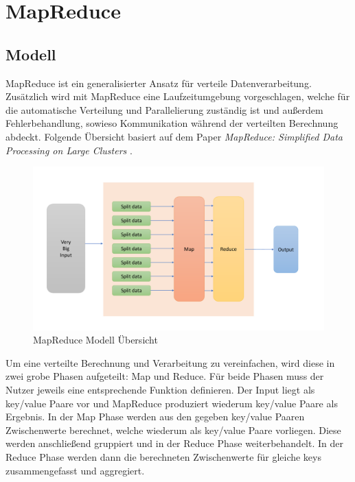 

\chapter{MapReduce}
\label{MapReduce}

\section{Modell}

MapReduce ist ein generalisierter Ansatz für verteile Datenverarbeitung.
Zusätzlich wird mit MapReduce eine Laufzeitumgebung vorgeschlagen, welche für die automatische Verteilung und Parallelierung zuständig ist und außerdem Fehlerbehandlung, sowieso Kommunikation während der verteilten Berechnung abdeckt.
Folgende Übersicht basiert auf dem Paper \textit{MapReduce: Simplified Data Processing on Large Clusters} \cite{mapReduce}.


\begin{figure}[H]
	\includegraphics[width=\textwidth]{pics/mapReduce/overview}
	\caption{MapReduce Modell Übersicht}
\end{figure}


Um eine verteilte Berechnung und Verarbeitung zu vereinfachen, wird diese in zwei grobe Phasen aufgeteilt: Map und Reduce.
Für beide Phasen muss der Nutzer jeweils eine entsprechende Funktion definieren.
Der Input liegt als key/value Paare vor und MapReduce produziert wiederum key/value Paare als Ergebnis.
In der Map Phase werden aus den gegeben key/value Paaren Zwischenwerte berechnet, welche wiederum als key/value Paare vorliegen. Diese werden anschließend gruppiert und in der Reduce Phase weiterbehandelt.
In der Reduce Phase werden dann die berechneten Zwischenwerte für gleiche keys zusammengefasst und aggregiert.

